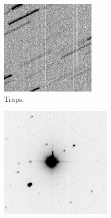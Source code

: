 \begin{figure}[!h]
        \vspace*{4mm}
        
        \begin{subfigure}{.3\textwidth}
            \centering
            \includegraphics[width=\textwidth]{images/traps2.jpg}
            \caption{Traps.}
            \label{fig:trap}
        \end{subfigure}
        \begin{subfigure}{.3\textwidth}
            \centering
            \includegraphics[width=\textwidth]{images/saturationtrail.png}

\end{subfigure}
\end{figure}
